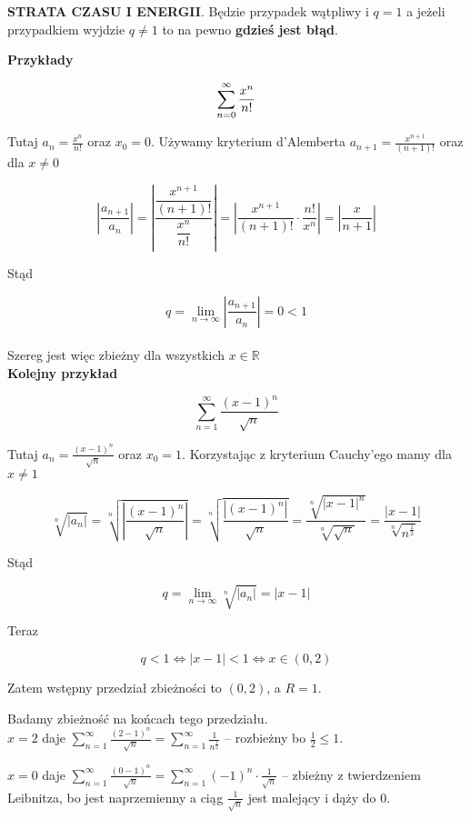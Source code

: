 \textbf{STRATA CZASU I ENERGII}. Będzie przypadek wątpliwy i $q = 1$ a jeżeli przypadkiem wyjdzie
$q \neq 1$ to na pewno \textbf{gdzieś jest błąd}.

\textbf{Przykłady}

$$ \sum\limits_{n = 0}^{\infty} \frac{x^n}{n!} $$

Tutaj $ a_n = \frac{x^n}{n!} $ oraz $ x_0 = 0 $. Używamy kryterium d'Alemberta $ a_{n+1} = \frac{x^{n+1}}{(n+1)!} $ oraz
dla $x \neq 0$

$$ \left| \frac{a_{n+1}}{a_n} \right| = \left| \frac{ \dfrac{x^{ n+1 }}{ (n+1)! } }{ \dfrac{ x^n }{ n! } } \right| 
= \left| \frac{x^{n+1}}{(n+1)!} \cdot \frac{n!}{x^n} \right| = \left| \frac{x}{n+1} \right| $$

Stąd

$$ q = \lim_{n \to \infty} \left| \frac{a_{n+1}}{a_n} \right| = 0 < 1 $$ \\

Szereg jest więc zbieżny dla wszystkich $ x \in \mathbb{R} $ \\

\textbf{Kolejny przykład}

$$ \sum\limits_{n = 1}^{\infty} \frac{(x - 1)^n}{\sqrt{n}} $$

Tutaj $ a_n = \frac{(x - 1)^n}{\sqrt{n}} $ oraz $ x_0 = 1 $. Korzystając z kryterium Cauchy'ego mamy dla $x \neq 1$

$$ \sqrt[n]{|a_n|} = \sqrt[n]{ \left| \frac{(x-1)^n}{\sqrt{n}} \right| } = \sqrt[n]{ \frac{\left|(x-1)^n \right|}{\sqrt{n}} }
= \frac{ \sqrt[n]{|x-1|^n} }{ \sqrt[n]{\sqrt{n}} } = \frac{|x-1|}{\sqrt[n]{n^{\frac{1}{2}}}}$$

Stąd

$$ q = \lim_{n \to \infty} \sqrt[n]{|a_n|} = |x-1| $$

Teraz

$$ q < 1 \Leftrightarrow |x - 1| < 1 \Leftrightarrow x \in (0, 2) $$

Zatem wstępny przedział zbieżności to $(0, 2)$, a $R = 1$.

Badamy zbieżność na końcach tego przedziału. \\

$x = 2$ daje $ \sum\limits_{n = 1}^{\infty} \frac{(2 - 1)^n}{\sqrt{n}} = \sum\limits_{n = 1}^{\infty} \frac{1}{n^{\frac{1}{2}}} $
-- rozbieżny bo $ \frac{1}{2} \leq 1 $.

$x = 0$ daje $ \sum\limits_{n = 1}^{\infty} \frac{(0 - 1)^n}{\sqrt{n}} = \sum\limits_{n = 1}^{\infty} (-1)^n \cdot \frac{1}{\sqrt{n}} $
-- zbieżny z twierdzeniem Leibnitza, bo jest naprzemienny a ciąg $ \frac{1}{\sqrt{n}} $ jest malejący i dąży do $0$. \\

